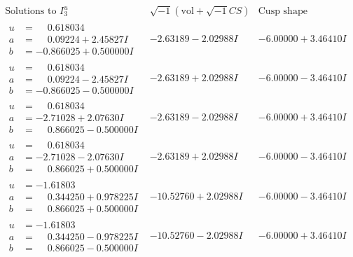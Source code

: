 \documentclass[1p]{elsarticle_modified}
\theoremstyle{definition}
\newcommand{\I}{\sqrt{-1}}
\begin{document}
$$\begin{array}{c|c|c}  
\text{Solutions to }I^u_{3}& \I (\text{vol} + \sqrt{-1}CS) & \text{Cusp shape}\\
 \hline 
\begin{aligned}
u &= \phantom{-}0.618034\phantom{ +0.000000I} \\
a &= \phantom{-}0.09224 + 2.45827 I \\
b &= -0.866025 + 0.500000 I\end{aligned}
 & -2.63189 - 2.02988 I & -6.00000 + 3.46410 I \\ \hline\begin{aligned}
u &= \phantom{-}0.618034\phantom{ +0.000000I} \\
a &= \phantom{-}0.09224 - 2.45827 I \\
b &= -0.866025 - 0.500000 I\end{aligned}
 & -2.63189 + 2.02988 I & -6.00000 - 3.46410 I \\ \hline\begin{aligned}
u &= \phantom{-}0.618034\phantom{ +0.000000I} \\
a &= -2.71028 + 2.07630 I \\
b &= \phantom{-}0.866025 - 0.500000 I\end{aligned}
 & -2.63189 - 2.02988 I & -6.00000 + 3.46410 I \\ \hline\begin{aligned}
u &= \phantom{-}0.618034\phantom{ +0.000000I} \\
a &= -2.71028 - 2.07630 I \\
b &= \phantom{-}0.866025 + 0.500000 I\end{aligned}
 & -2.63189 + 2.02988 I & -6.00000 - 3.46410 I \\ \hline\begin{aligned}
u &= -1.61803\phantom{ +0.000000I} \\
a &= \phantom{-}0.344250 + 0.978225 I \\
b &= \phantom{-}0.866025 + 0.500000 I\end{aligned}
 & -10.52760 + 2.02988 I & -6.00000 - 3.46410 I \\ \hline\begin{aligned}
u &= -1.61803\phantom{ +0.000000I} \\
a &= \phantom{-}0.344250 - 0.978225 I \\
b &= \phantom{-}0.866025 - 0.500000 I\end{aligned}
 & -10.52760 - 2.02988 I & -6.00000 + 3.46410 I \\ \hline\begin{aligned}

\end{aligned}
\end{array}$$
\end{document}
